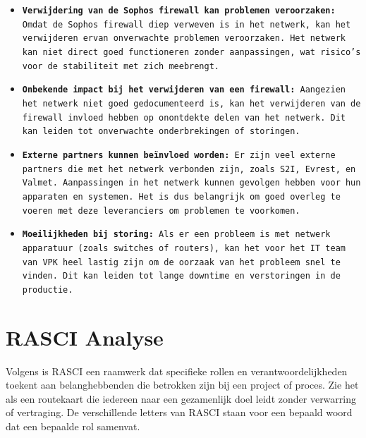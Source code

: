 \begin{itemize}
\item \texttt{\textbf{Verwijdering van de Sophos firewall kan problemen veroorzaken:} Omdat de Sophos firewall diep verweven is in het netwerk, kan het verwijderen ervan onverwachte problemen veroorzaken. Het netwerk kan niet direct goed functioneren zonder aanpassingen, wat risico’s voor de stabiliteit met zich meebrengt.}

\item \texttt{\textbf{Onbekende impact bij het verwijderen van een firewall:} Aangezien het netwerk niet goed gedocumenteerd is, kan het verwijderen van de firewall invloed hebben op onontdekte delen van het netwerk. Dit kan leiden tot onverwachte onderbrekingen of storingen.}

\item \texttt{\textbf{Externe partners kunnen beïnvloed worden:} Er zijn veel externe partners die met het netwerk verbonden zijn, zoals S2I, Evrest, en Valmet. Aanpassingen in het netwerk kunnen gevolgen hebben voor hun apparaten en systemen. Het is dus belangrijk om goed overleg te voeren met deze leveranciers om problemen te voorkomen.}

\item \texttt{\textbf{Moeilijkheden bij storing:} Als er een probleem is met netwerk apparatuur (zoals switches of routers), kan het voor het IT team van VPK heel lastig zijn om de oorzaak van het probleem snel te vinden. Dit kan leiden tot lange downtime en verstoringen in de productie.}
\end{itemize}


\section{RASCI Analyse}

Volgens \textcite{Epam2024} is RASCI een raamwerk dat specifieke rollen en verantwoordelijkheden toekent aan belanghebbenden die betrokken zijn bij een project of proces. Zie het als een routekaart die iedereen naar een gezamenlijk doel leidt zonder verwarring of vertraging. 
De verschillende letters van RASCI staan voor een bepaald woord dat een bepaalde rol samenvat.

